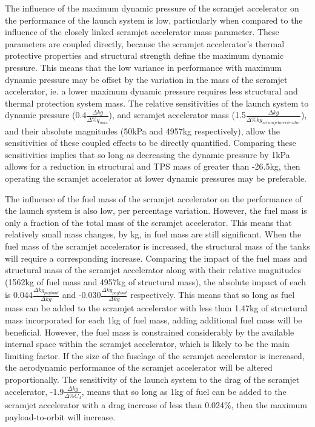 The influence of the maximum dynamic pressure of the scramjet accelerator on the performance of the launch system is low, particularly when compared to the influence of the closely linked scramjet accelerator mass parameter. These parameters are coupled directly, because the scramjet accelerator's thermal protective properties and structural strength define the maximum dynamic pressure. This means that the low variance in performance with maximum dynamic pressure may be offset by the variation in the mass of the scramjet accelerator, ie. a lower maximum dynamic pressure requires less structural and thermal protection system mass.
The relative sensitivities of the launch system to dynamic pressure (0.4$\frac{\Delta kg}{\Delta\%q_{max}}$), and scramjet accelerator mass (1.5$\frac{\Delta kg}{\Delta\%kg_{scramjet accelerator}}$), and their absolute magnitudes (50kPa and 4957kg respectively), allow the sensitivities of these coupled effects to be directly quantified. Comparing these sensitivities implies that so long as decreasing the dynamic pressure by 1kPa allows for a reduction in structural and TPS mass of greater than -26.5kg, then operating the scramjet accelerator at lower dynamic pressures may be preferable. 

The influence of the fuel mass of the scramjet accelerator on the performance of the launch system is also low, per percentage variation. However, the fuel mass is only a fraction of the total mass of the scramjet accelerator. This means that relatively small mass changes, by kg, in fuel mass are still significant. 
When the fuel mass of the scramjet accelerator is increased, the structural mass of the tanks will require a corresponding increase. 
Comparing the impact of the fuel mass and structural mass of the scramjet accelerator along with their relative magnitudes (1562kg of fuel mass and 4957kg of structural mass), the absolute impact of each is 0.044$\frac{\Delta kg_{payload}}{\Delta kg}$ and -0.030$\frac{\Delta kg_{payload}}{\Delta kg}$ respectively. This means that so long as fuel mass can be added to the scramjet accelerator with less than 1.47kg of structural mass incorporated for each 1kg of fuel mass, adding additional fuel mass will be beneficial. However, the fuel mass is constrained considerably by the available internal space within the scramjet accelerator, which is likely to be the main limiting factor.
If the size of the fuselage of the scramjet accelerator is increased, the aerodynamic performance of the scramjet accelerator will be altered proportionally. 
The sensitivity of the launch system to the drag of the scramjet accelerator, -1.9$\frac{\Delta kg}{\Delta\%C_{d}}$, means that so long as 1kg of fuel can be added to the scramjet accelerator with a drag increase of less than 0.024\%, then the maximum payload-to-orbit will increase. 


